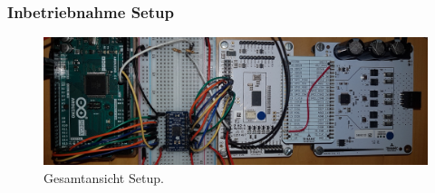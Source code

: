 \subsubsection{Inbetriebnahme Setup}\label{Appendix:TMC6200_Setup}

\begin{figure}[H]
	\centering
	\includegraphics[angle=270,width=\textwidth]{graphics/2_komplett1}
	\caption{Gesamtansicht Setup.}
	\label{fig:2_komplett1}
\end{figure}

